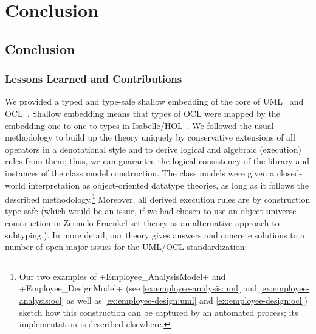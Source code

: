 \part{Conclusion}

\chapter{Conclusion}

\section{Lessons Learned and Contributions}
We provided a typed and type-safe shallow embedding of the core of
UML~\cite{omg:uml-infrastructure:2011,omg:uml-superstructure:2011} and
OCL~\cite{omg:ocl:2012}. Shallow embedding means that types of OCL
were mapped by the embedding one-to-one to types in
Isabelle/HOL~\cite{nipkow.ea:isabelle:2002}.  We followed the usual
methodology to build up the theory uniquely by conservative extensions
of all operators in a denotational style and to derive logical and
algebraic (execution) rules from them; thus, we can guarantee the
logical consistency of the library and instances of the class model
construction. The class models were given a closed-world interpretation 
as object-oriented datatype theories, as
long as it follows the described methodology.\footnote{Our two
  examples of \inlineisar+Employee_AnalysisModel+ and
  \inlineisar+Employee_DesignModel+ (see
  \autoref{ex:employee-analysis:uml} and
  \autoref{ex:employee-analysis:ocl} as well as
  \autoref{ex:employee-design:uml} and
  \autoref{ex:employee-design:ocl}) sketch how this construction can
  be captured by an automated process; its implementation is described 
  elsewhere.}  Moreover, all derived
execution rules are by construction type-safe (which would be an
issue, if we had chosen to use an object universe construction in
Zermelo-Fraenkel set theory as an alternative approach to subtyping.).
In more detail, our theory gives answers and concrete solutions to a
number of open major issues for the UML/OCL standardization:
